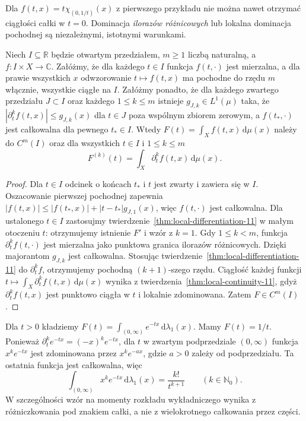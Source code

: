 \begin{uwaga}
Dla $f(t,x)=t\chi_{(0,1/t)}(x)$ z pierwszego przykładu
nie można nawet otrzymać ciągłości całki w $t=0$.
Dominacja \emph{ilorazów różnicowych} lub lokalna dominacja
pochodnej są niezależnymi, istotnymi warunkami.
\end{uwaga}

\begin{twierdzenie}
\label{thm:higher-differentiation-11}
Niech $I\subseteq\mathbb R$ będzie otwartym przedziałem,
$m\ge1$ liczbą naturalną, a $f:I\times X\to\mathbb C$.
Załóżmy, że dla każdego $t\in I$ funkcja $f(t,\cdot)$ jest mierzalna,
a dla prawie wszystkich $x$ odwzorowanie $t\mapsto f(t,x)$
ma pochodne do rzędu $m$ włącznie, wszystkie ciągłe na $I$.
Załóżmy ponadto, że dla każdego zwartego przedziału
$J\subset I$ oraz każdego $1\le k\le m$
istnieje $g_{J,k}\in L^1(\mu)$ taka, że
$|\partial_t^k f(t,x)|\le g_{J,k}(x)$ dla $t\in J$
poza wspólnym zbiorem zerowym, a $f(t_*,\cdot)$ jest
całkowalna dla pewnego $t_*\in I$.
Wtedy $F(t)=\int_Xf(t,x)\,\mathrm d\mu(x)$ należy
do $C^m(I)$ oraz dla wszystkich $t\in I$ i $1\le k\le m$
\begin{equation}\label{eq:higher-param-11}
F^{(k)}(t)=\int_X\partial_t^k f(t,x)\,\mathrm d\mu(x).
\end{equation}
\end{twierdzenie}
\begin{proof}
Dla $t\in I$ odcinek o końcach $t_*$ i $t$ jest zwarty
i zawiera się w $I$. Oszacowanie pierwszej pochodnej
zapewnia $|f(t,x)|\le|f(t_*,x)|+|t-t_*|g_{J,1}(x)$,
więc $f(t,\cdot)$ jest całkowalna. Dla ustalonego
$t\in I$ zastosujmy twierdzenie~\ref{thm:local-differentiation-11}
w małym otoczeniu $t$: otrzymujemy istnienie $F'$ i wzór
z $k=1$. Gdy $1\le k<m$, funkcja $\partial_t^kf(t,\cdot)$
jest mierzalna jako punktowa granica ilorazów różnicowych.
Dzięki majorantom $g_{J,k}$ jest całkowalna. Stosując
twierdzenie~\ref{thm:local-differentiation-11} do
$\partial_t^kf$, otrzymujemy pochodną $(k+1)$-szego rzędu.
Ciągłość każdej funkcji $t\mapsto\int_X\partial_t^kf(t,x)\,\mathrm d\mu(x)$
wynika z twierdzenia~\ref{thm:local-continuity-11},
gdyż $\partial_t^kf(t,x)$ jest punktowo ciągła w $t$
i lokalnie zdominowana. Zatem $F\in C^m(I)$.
\end{proof}

\begin{przyklad}
\label{ex:laplace-11}
Dla $t>0$ kładziemy $F(t)=\int_{(0,\infty)}e^{-tx}\,\mathrm d\lambda_1(x)$.
Mamy $F(t)=1/t$. Ponieważ
$\partial_t^k e^{-tx}=(-x)^k e^{-tx}$, dla
$t$ w zwartym podprzedziale $(0,\infty)$ funkcja
$x^k e^{-tx}$ jest zdominowana przez
$x^ke^{-ax}$, gdzie $a>0$ zależy od podprzedziału.
Ta ostatnia funkcja jest całkowalna, więc
\[
\int_{(0,\infty)}x^ke^{-tx}\,\mathrm d\lambda_1(x)
=\frac{k!}{t^{k+1}}\qquad(k\in\mathbb N_0).
\]
W szczególności wzór na momenty rozkładu wykładniczego
wynika z różniczkowania pod znakiem całki, a nie z
wielokrotnego całkowania przez części.
\end{przyklad}


